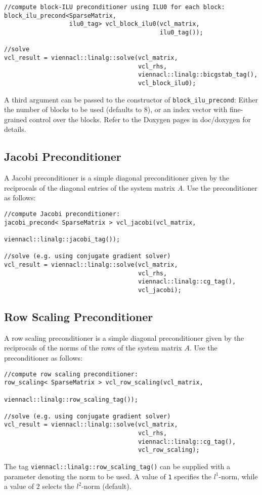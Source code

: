 \begin{lstlisting}
//compute block-ILU preconditioner using ILU0 for each block:
block_ilu_precond<SparseMatrix,
                  ilu0_tag> vcl_block_ilu0(vcl_matrix,
                                           ilu0_tag());

//solve
vcl_result = viennacl::linalg::solve(vcl_matrix,
                                     vcl_rhs,
                                     viennacl::linalg::bicgstab_tag(),
                                     vcl_block_ilu0);
\end{lstlisting}
A third argument can be passed to the constructor of \lstinline|block_ilu_precond|:
Either the number of blocks to be used (defaults to $8$), or an index vector with fine-grained control over the blocks. Refer to the Doxygen pages in doc/doxygen for details.


\subsection{Jacobi Preconditioner}
A Jacobi preconditioner is a simple diagonal preconditioner given by the reciprocals of the diagonal entries of the system matrix $A$.
Use the preconditioner as follows:
\begin{lstlisting}
//compute Jacobi preconditioner:
jacobi_precond< SparseMatrix > vcl_jacobi(vcl_matrix,
                                          viennacl::linalg::jacobi_tag());

//solve (e.g. using conjugate gradient solver)
vcl_result = viennacl::linalg::solve(vcl_matrix,
                                     vcl_rhs,
                                     viennacl::linalg::cg_tag(),
                                     vcl_jacobi);
\end{lstlisting}


\subsection{Row Scaling Preconditioner}
A row scaling preconditioner is a simple diagonal preconditioner given by the reciprocals of the norms of the rows of the system matrix $A$.
Use the preconditioner as follows:
\begin{lstlisting}
//compute row scaling preconditioner:
row_scaling< SparseMatrix > vcl_row_scaling(vcl_matrix,
                                      viennacl::linalg::row_scaling_tag());

//solve (e.g. using conjugate gradient solver)
vcl_result = viennacl::linalg::solve(vcl_matrix,
                                     vcl_rhs,
                                     viennacl::linalg::cg_tag(),
                                     vcl_row_scaling);
\end{lstlisting}
The tag \lstinline|viennacl::linalg::row_scaling_tag()| can be supplied with a parameter denoting the norm to be used. A value of \lstinline|1| specifies the
$l^1$-norm, while a value of $2$ selects the $l^2$-norm (default).



